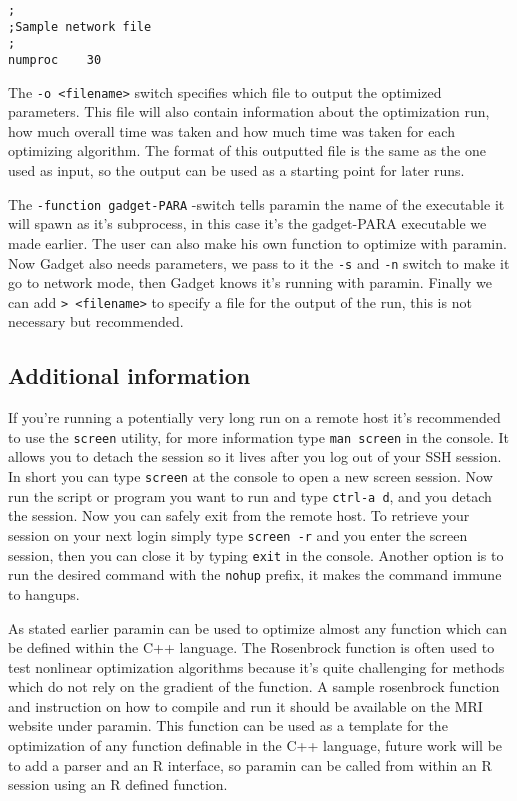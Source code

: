 \documentclass[]{book}
\begin{document}
\begin{verbatim}
;
;Sample network file
;
numproc    30
\end{verbatim}

The \texttt{-o\ \textless{}filename\textgreater{}} switch specifies which file to output the optimized
parameters. This file will also contain information about the
optimization run, how much overall time was taken and how much time was
taken for each optimizing algorithm. The format of this outputted file
is the same as the one used as input, so the output can be used as a
starting point for later runs.

The \texttt{-function\ gadget-PARA} -switch tells paramin the name of the
executable it will spawn as it's subprocess, in this case it's the
gadget-PARA executable we made earlier. The user can also make his own
function to optimize with paramin. Now Gadget also needs parameters, we
pass to it the \texttt{-s} and \texttt{-n} switch to make it go to network mode, then
Gadget knows it's running with paramin. Finally we can add
\texttt{\textgreater{}\ \textless{}filename\textgreater{}} to specify a file for the output of the run, this is not
necessary but recommended.

\hypertarget{additional-information}{%
\subsection{Additional information}\label{additional-information}}

If you're running a potentially very long run on a remote host it's
recommended to use the \texttt{screen} utility, for more information type
\texttt{man\ screen} in the console. It allows you to detach the session so it
lives after you log out of your SSH session. In short you can type
\texttt{screen} at the console to open a new screen session. Now run the script
or program you want to run and type \texttt{ctrl-a\ d}, and you detach the
session. Now you can safely exit from the remote host. To retrieve your
session on your next login simply type \texttt{screen\ -r} and you enter the
screen session, then you can close it by typing \texttt{exit} in the console.
Another option is to run the desired command with the \texttt{nohup} prefix, it
makes the command immune to hangups.

As stated earlier paramin can be used to optimize almost any function
which can be defined within the C++ language. The Rosenbrock function is
often used to test nonlinear optimization algorithms because it's quite
challenging for methods which do not rely on the gradient of the
function. A sample rosenbrock function and instruction on how to compile
and run it should be available on the MRI website under paramin. This
function can be used as a template for the optimization of any function
definable in the C++ language, future work will be to add a parser and
an R interface, so paramin can be called from within an R session using
an R defined function.
\end{document}
